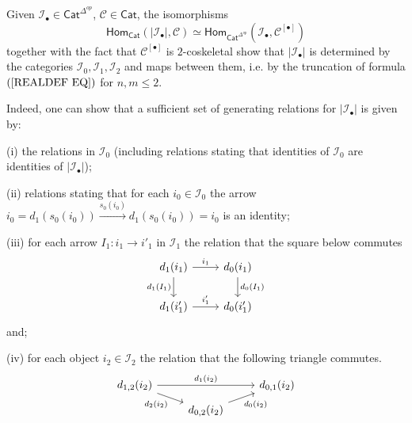 \documentclass[a4paper,10pt]{article}%
\begin{document}
\begin{remark}
	Given $\mathcal{I}_{\bullet} \in \mathsf{Cat}^{\Delta^{op}}$, $\mathcal{C} \in \mathsf{Cat}$, the isomorphisms
	\[
	\mathsf{Hom}_{\mathsf{Cat}}\left(|\mathcal{I}_{\bullet}|,\mathcal{C}\right)
		\simeq
	\mathsf{Hom}_{\mathsf{Cat}^{\Delta^{op}}}\left(\mathcal{I}_{\bullet},\mathcal{C}^{[\bullet]}\right)
	\]
	together with the fact that $\mathcal{C}^{[\bullet]}$ is  $2$-coskeletal show that $|\mathcal{I}_{\bullet}|$
	is determined by the categories 
	$\mathcal{I}_0,\mathcal{I}_1,\mathcal{I}_2$
	and maps between them, i.e. by the truncation of
	formula $(\ref{REALDEF EQ})$ for $n,m \leq 2$.

Indeed, one can show that a sufficient set of generating relations for $|\mathcal{I}_{\bullet}|$ is given by:
\begin{inparaenum}
\item[(i)]
 the relations in $\mathcal{I}_0$
(including relations stating that identities of  
$\mathcal{I}_0$ are identities of $|\mathcal{I}_{\bullet}|$);
\item[(ii)] relations stating that for each $i_0 \in \mathcal{I}_0$ the arrow 
$i_0 = d_1(s_0(i_0)) \xrightarrow{s_0(i_0)} d_1(s_0(i_0)) = i_0$
is an identity;
\item[(iii)] for each arrow $I_1\colon i_1 \to i'_1$ in $\mathcal{I}_1$ the relation that the square below commutes
\[
\begin{tikzcd}
	d_1(i_1) \ar{r}{i_1} \ar{d}[swap]{d_1(I_1)} & 
	d_0(i_1) \ar{d}{d_0(I_1)}
\\
	d_1(i'_1) \ar{r}{i'_1} &
	d_0(i'_1)
\end{tikzcd}
\]
and;
\item[(iv)] for each object $i_2 \in \mathcal{I}_2$ the relation that the following triangle commutes.
\[
\begin{tikzcd}[row sep = 0.5em]
	d_{1,2}(i_2) \ar{rr}{d_1(i_2)} \ar{rd}[swap]{d_2(i_2)} & & d_{0,1}(i_2) \\
	& d_{0,2}(i_2) \ar{ru}[swap]{d_0(i_2)}
\end{tikzcd}
\]
\end{inparaenum}
\end{remark}

\end{document}
